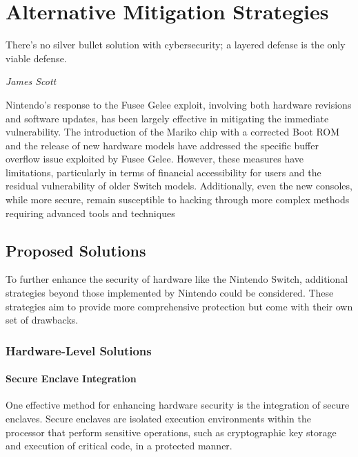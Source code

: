 \chapter{Alternative Mitigation Strategies}
\epigraph{There's no silver bullet solution with cybersecurity; a layered defense is the only viable defense.}{\textit{James Scott}}

Nintendo's response to the Fusee Gelee exploit, involving both hardware revisions and software updates, has been largely effective in mitigating the immediate vulnerability. The introduction of the Mariko chip with a corrected Boot ROM and the release of new hardware models have addressed the specific buffer overflow issue exploited by Fusee Gelee. However, these measures have limitations, particularly in terms of financial accessibility for users and the residual vulnerability of older Switch models. Additionally, even the new consoles, while more secure, remain susceptible to hacking through more complex methods requiring advanced tools and techniques

\section{Proposed Solutions}
To further enhance the security of hardware like the Nintendo Switch, additional strategies beyond those implemented by Nintendo could be considered. These strategies aim to provide more comprehensive protection but come with their own set of drawbacks.

\subsection{Hardware-Level Solutions}
\subsubsection{Secure Enclave Integration}

One effective method for enhancing hardware security is the integration of secure enclaves. Secure enclaves are isolated execution environments within the processor that perform sensitive operations, such as cryptographic key storage and execution of critical code, in a protected manner.\cite{IntroductionHardwareSecurity}

